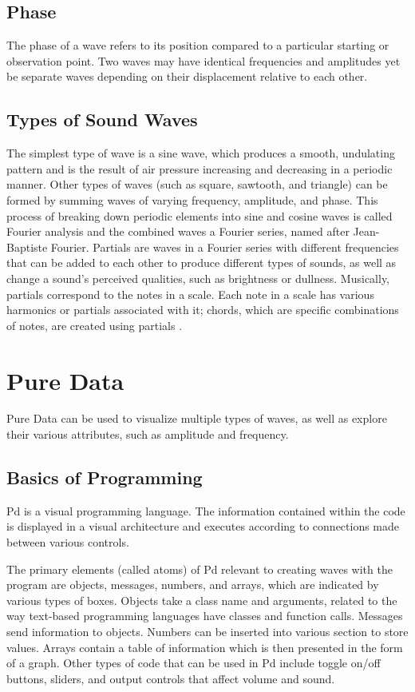 \documentclass[12pt]{article}
\begin{document}
\subsection{Phase}

The phase of a wave refers to its position compared to a particular starting or observation point. Two waves may have identical frequencies and amplitudes yet be separate waves depending on their displacement relative to each other. 

\subsection{Types of Sound Waves}

The simplest type of wave is a sine wave, which produces a smooth, undulating pattern and is the result of air pressure increasing and decreasing in a periodic manner. Other types of waves (such as square, sawtooth, and triangle) can be formed by summing waves of varying frequency, amplitude, and phase. This process of breaking down periodic elements into sine and cosine waves is called Fourier analysis and the combined waves a Fourier series, named after Jean-Baptiste Fourier. Partials are waves in a Fourier series with different frequencies that can be added to each other to produce different types of sounds, as well as change a sound's perceived qualities, such as brightness or dullness. Musically, partials correspond to the notes in a scale. Each note in a scale has various harmonics or partials associated with it; chords, which are specific combinations of notes, are created using partials .~\cite{hillerson,pierce,backus}

\section{Pure Data}

Pure Data can be used to visualize multiple types of waves, as well as explore their various attributes, such as amplitude and frequency.

\subsection{Basics of Programming}

Pd is a visual programming language. The information contained within the code is displayed in a visual architecture and executes according to connections made between various controls.

The primary elements (called atoms) of Pd relevant to creating waves with the program are objects, messages, numbers, and arrays, which are indicated by various types of boxes. Objects take a class name and arguments, related to the way text-based programming languages have classes and function calls. Messages send information to objects. Numbers can be inserted into various section to store values. Arrays contain a table of information which is then presented in the form of a graph. Other types of code that can be used in Pd include toggle on/off buttons, sliders, and output controls that affect volume and sound.
\end{document}
